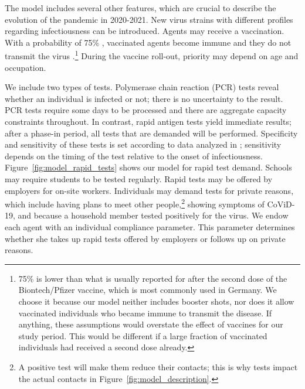 The model includes several other features, which are crucial to describe the evolution
of the pandemic in 2020-2021. New virus strains with different profiles regarding
infectiousness can be introduced. Agents may receive a vaccination. With a probability
of 75\% \citep{Hunter2021}, vaccinated agents become immune and they do not transmit the
virus \citep{Petter2021, LevineTiefenbrun2021, Pritchard2021}.\footnote{75\% is lower
than what is usually reported for after the second dose of the Biontech/Pfizer vaccine,
which is most commonly used in Germany. We choose it because our model neither includes
booster shots, nor does it allow vaccinated individuals who became immune to transmit
the disease\citep{Petter2021, LevineTiefenbrun2021, Pritchard2021}. If anything, these
assumptions would overstate the effect of vaccines for our study period. This would be
different if a large fraction of vaccinated individuals had received a second dose
already.} During the vaccine roll-out, priority may depend on age and occupation.

We include two types of tests. Polymerase chain reaction (PCR) tests reveal whether an
individual is infected or not; there is no uncertainty to the result. PCR tests require
some days to be processed and there are aggregate capacity constraints throughout. In
contrast, rapid antigen tests yield immediate results; after a phase-in period, all tests
that are demanded will be performed. Specificity and sensitivity of these tests is set
according to data analyzed in \cite{Bruemmer2021, Smith2021}; sensitivity depends on the
timing of the test relative to the onset of infectiousness.
Figure~\ref{fig:model_rapid_tests} shows our model for rapid test demand. Schools may
require students to be tested regularly. Rapid tests may be offered by employers for
on-site workers. Individuals may demand tests for private reasons, which include having
plans to meet other people,\footnote{A positive test will make them reduce their
contacts; this is why tests impact the actual contacts in
Figure~\ref{fig:model_description}.} showing symptoms of CoViD-19, and because a
household member tested positively for the virus. We endow each agent with an individual
compliance parameter. This parameter determines whether she takes up rapid tests offered
by employers or follows up on private reasons.

